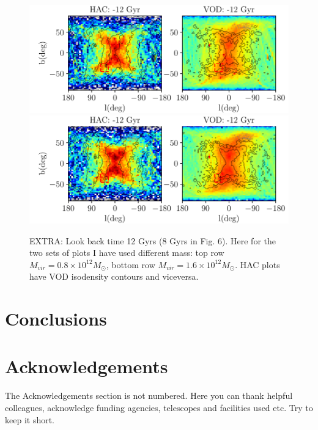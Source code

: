 \documentclass[fleqn,usenatbib]{mnras}
\begin{document}
\begin{figure}
	       	       \includegraphics[scale=0.52]{VOD_orbits_12Gyrs.pdf}\\
	       	       	       	       \includegraphics[scale=0.52]{VOD_orbits_12Gyrs_doublemass.pdf}
   \caption{EXTRA: Look back time 12 Gyrs (8 Gyrs in Fig. 6). Here for the two sets of plots I have used different mass: top row $M_{vir} = 0.8 \times 10^{12} M_{\odot}$, bottom row $M_{vir} = 1.6 \times 10^{12} M_{\odot}$.  HAC plots have VOD isodensity contours and viceversa.}
    \label{fig:orbitslb}
\end{figure}
\section{Conclusions}

\section*{Acknowledgements}

The Acknowledgements section is not numbered. Here you can thank helpful
colleagues, acknowledge funding agencies, telescopes and facilities used etc.
Try to keep it short.









\bsp	%
\label{lastpage}
\end{document}
